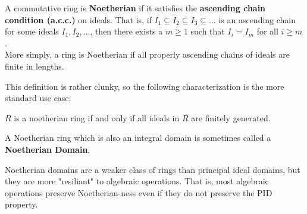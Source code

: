 \begin{definition}
	A commutative ring is \textbf{Noetherian} if it satisfies the \textbf{ascending chain condition (a.c.c.)} on ideals. That is, if \(I_1 \subseteq I_2 \subseteq I_3 \subseteq \ldots\) is an ascending chain for some ideals \(I_1, I_2, \ldots\), then there exists a \(m \ge 1\) such that \(I_{i} = I_{m}\) for all \(i \ge m\).\\
	More simply, a ring is Noetherian if all properly ascending chains of ideals are finite in lengths.
\end{definition}
This definition is rather clunky, so the following characterization is the more standard use case:
\begin{theorem}
\(R\) is a noetherian ring if and only if all ideals in \(R\) are finitely generated.
\end{theorem}
\begin{remark}
	A Noetherian ring which is also an integral domain is sometimes called a \textbf{Noetherian Domain}.
\end{remark}
Noetherian domains are a weaker class of rings than principal ideal domains, but they are more "resiliant" to algebraic operations. That is, most algebraic operations preserve Noetherian-ness even if they do not preserve the PID property.
